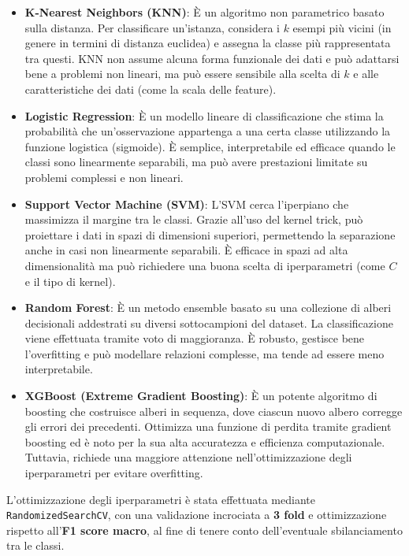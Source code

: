 \documentclass[minted, draw]{../tex/hebdomon}
\begin{document}
\begin{itemize}

\item \textbf{K-Nearest Neighbors (KNN)}: È un algoritmo non parametrico basato sulla distanza. Per classificare un'istanza, considera i $k$ esempi più vicini (in genere in termini di distanza euclidea) e assegna la classe più rappresentata tra questi. KNN non assume alcuna forma funzionale dei dati e può adattarsi bene a problemi non lineari, ma può essere sensibile alla scelta di $k$ e alle caratteristiche dei dati (come la scala delle feature).

\item \textbf{Logistic Regression}: È un modello lineare di classificazione che stima la probabilità che un'osservazione appartenga a una certa classe utilizzando la funzione logistica (sigmoide). È semplice, interpretabile ed efficace quando le classi sono linearmente separabili, ma può avere prestazioni limitate su problemi complessi e non lineari.

\item \textbf{Support Vector Machine (SVM)}: L'SVM cerca l'iperpiano che massimizza il margine tra le classi. Grazie all'uso del kernel trick, può proiettare i dati in spazi di dimensioni superiori, permettendo la separazione anche in casi non linearmente separabili. È efficace in spazi ad alta dimensionalità ma può richiedere una buona scelta di iperparametri (come $C$ e il tipo di kernel).

\item \textbf{Random Forest}: È un metodo ensemble basato su una collezione di alberi decisionali addestrati su diversi sottocampioni del dataset. La classificazione viene effettuata tramite voto di maggioranza. È robusto, gestisce bene l'overfitting e può modellare relazioni complesse, ma tende ad essere meno interpretabile.

\item \textbf{XGBoost (Extreme Gradient Boosting)}: È un potente algoritmo di boosting che costruisce alberi in sequenza, dove ciascun nuovo albero corregge gli errori dei precedenti. Ottimizza una funzione di perdita tramite gradient boosting ed è noto per la sua alta accuratezza e efficienza computazionale. Tuttavia, richiede una maggiore attenzione nell’ottimizzazione degli iperparametri per evitare overfitting.

\end{itemize}

L'ottimizzazione degli iperparametri è stata effettuata mediante \texttt{RandomizedSearchCV}, con una validazione incrociata a \textbf{3 fold} e ottimizzazione rispetto all'\textbf{F1 score macro}, al fine di tenere conto dell'eventuale sbilanciamento tra le classi.
\end{document}

